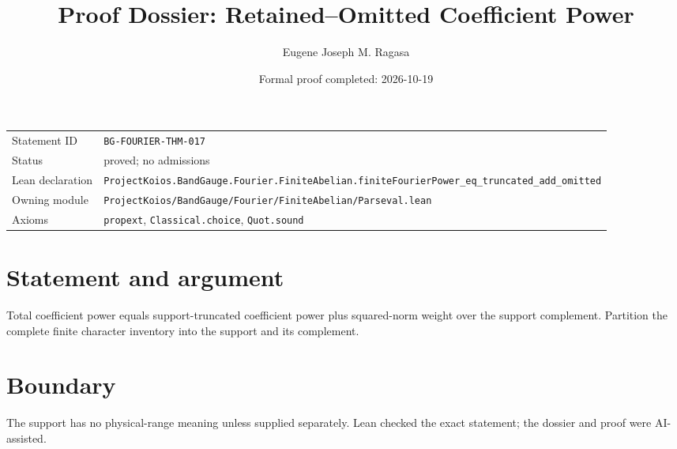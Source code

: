 \documentclass[11pt]{article}
\title{Proof Dossier: Retained--Omitted Coefficient Power}
\author{Eugene Joseph M. Ragasa}
\date{Formal proof completed: 2026-10-19}
\begin{document}
\maketitle
\noindent\begin{tabularx}{\textwidth}{@{}lX@{}}\toprule
Statement ID & \texttt{BG-FOURIER-THM-017} \\
Status & proved; no admissions \\
Lean declaration & \texttt{ProjectKoios.BandGauge.Fourier.FiniteAbelian.}\newline\texttt{finiteFourierPower\_eq\_truncated\_add\_omitted} \\
Owning module & \texttt{ProjectKoios/BandGauge/Fourier/FiniteAbelian/Parseval.lean} \\
Axioms & \texttt{propext}, \texttt{Classical.choice}, \texttt{Quot.sound} \\
\bottomrule\end{tabularx}
\section{Statement and argument}
Total coefficient power equals support-truncated coefficient power plus squared-norm weight over the support complement. Partition the complete finite character inventory into the support and its complement.
\section{Boundary}
The support has no physical-range meaning unless supplied separately. Lean checked the exact statement; the dossier and proof were AI-assisted.
\end{document}
